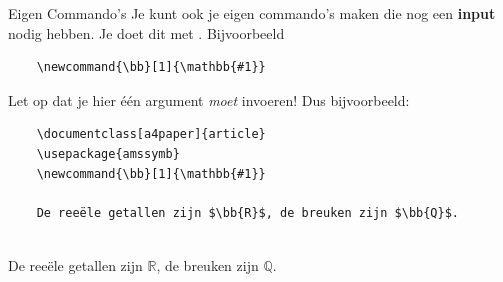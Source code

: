 \begin{frame}[fragile=singleslide]{Eigen Commando's}
Je kunt ook je eigen commando's maken die nog een \textbf{input} nodig hebben. 
Je doet dit met \texttt{\newcommand{\naam}[1]{commando {#1}}}. 
Bijvoorbeeld
\begin{verbatim}
    \newcommand{\bb}[1]{\mathbb{#1}}
\end{verbatim}
\pause
Let op dat je hier één argument \emph{moet} invoeren!
\pause
\newcommand{\bb}[1]{\mathbb{#1}}
Dus bijvoorbeeld:
\begin{verbatim}
    \documentclass[a4paper]{article}
    \usepackage{amssymb}
    \newcommand{\bb}[1]{\mathbb{#1}}
    
    De reeële getallen zijn $\bb{R}$, de breuken zijn $\bb{Q}$. 
    
\end{verbatim}
\pause
\begin{tcolorbox}[boxrule=0.5pt, colback=white]
    De reeële getallen zijn $\bb{R}$, de breuken zijn $\bb{Q}$. 
\end{tcolorbox}
\end{frame}

